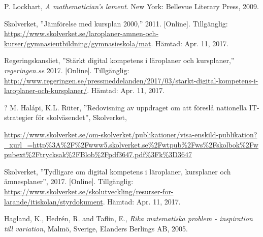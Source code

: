     P. Lockhart, \textit{A mathematician's lament}. New York: Bellevue Literary Press, 2009.
    
    Skolverket, ''Jämförelse med kursplan 2000,'' 2011. [Online]. Tillgänglig: \url{https://www.skolverket.se/laroplaner-amnen-och-kurser/gymnasieutbildning/gymnasieskola/mat}. Hämtad: Apr. 11, 2017.
    
    Regeringskansliet, ''Stärkt digital kompetens i läroplaner och kursplaner,'' \textsl{regeringen.se} 2017. [Online]. Tillgänglig: \url{http://www.regeringen.se/pressmeddelanden/2017/03/starkt-digital-kompetens-i-laroplaner-och-kursplaner/}. Hämtad: Apr. 11, 2017.
    
    ?
    M. Halápi, K.L. Rüter, ''Redovisning av uppdraget om att föreslå nationella IT-strategier för skolväsendet'', Skolverket,
    
    \url{https://www.skolverket.se/om-skolverket/publikationer/visa-enskild-publikation?_xurl_=http\%3A\%2F\%2Fwww5.skolverket.se\%2Fwtpub\%2Fws\%2Fskolbok\%2Fwpubext\%2Ftrycksak\%2FBlob\%2Fpdf3647.pdf\%3Fk\%3D3647}
    
   Skolverket, ''Tydligare om digital kompetens i läroplaner, kursplaner och ämnesplaner'', 2017. [Online]. Tillgänglig: \url{https://www.skolverket.se/skolutveckling/resurser-for-larande/itiskolan/styrdokument}. Hämtad: Apr. 11, 2017.
   
    Hagland, K., Hedrén, R. and Taflin, E., \textit{Rika matematiska problem - inspiration till variation}, Malmö, Sverige, Elanders Berlings AB, 2005.